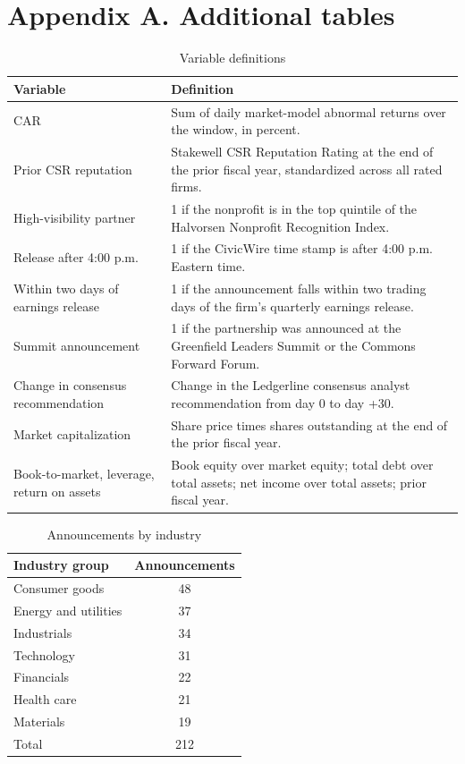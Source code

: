 \documentclass[11pt]{article}
\begin{document}
\clearpage
\appendix
\section*{Appendix A. Additional tables}

\begin{table}[h!]
\centering
\begin{threeparttable}
\renewcommand{\thetable}{A1}
\caption{Variable definitions}
\small
\begin{tabular}{p{}p{}}
\toprule
Variable & Definition \\
\midrule
CAR & Sum of daily market-model abnormal returns over the window, in percent. \\
Prior CSR reputation & Stakewell CSR Reputation Rating at the end of the prior fiscal year, standardized across all rated firms. \\
High-visibility partner & 1 if the nonprofit is in the top quintile of the Halvorsen Nonprofit Recognition Index. \\
Release after 4:00 p.m. & 1 if the CivicWire time stamp is after 4:00 p.m. Eastern time. \\
Within two days of earnings release & 1 if the announcement falls within two trading days of the firm's quarterly earnings release. \\
Summit announcement & 1 if the partnership was announced at the Greenfield Leaders Summit or the Commons Forward Forum. \\
Change in consensus recommendation & Change in the Ledgerline consensus analyst recommendation from day 0 to day +30. \\
Market capitalization & Share price times shares outstanding at the end of the prior fiscal year. \\
Book-to-market, leverage, return on assets & Book equity over market equity; total debt over total assets; net income over total assets; prior fiscal year. \\
\bottomrule
\end{tabular}
\end{threeparttable}
\end{table}

\begin{table}[h!]
\centering
\begin{threeparttable}
\renewcommand{\thetable}{A2}
\caption{Announcements by industry}
\small
\begin{tabular}{lc}
\toprule
Industry group & Announcements \\
\midrule
Consumer goods & 48 \\
Energy and utilities & 37 \\
Industrials & 34 \\
Technology & 31 \\
Financials & 22 \\
Health care & 21 \\
Materials & 19 \\
\midrule
Total & 212 \\
\bottomrule
\end{tabular}
\end{threeparttable}
\end{table}
\end{document}
